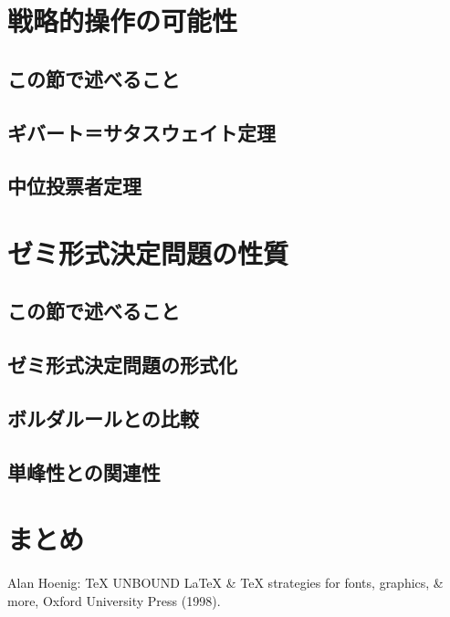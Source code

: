 \documentclass{jsarticle}
\begin{document}
\section{戦略的操作の可能性}
\subsection{この節で述べること}
\subsection{ギバート＝サタスウェイト定理}
\subsection{中位投票者定理}

\section{ゼミ形式決定問題の性質}
\subsection{この節で述べること}
\subsection{ゼミ形式決定問題の形式化}
\subsection{ボルダルールとの比較}
\subsection{単峰性との関連性}

\section{まとめ}

\begin{thebibliography}{9}
  Alan Hoenig: \TeX{} UNBOUND \LaTeX{} \& \TeX{} strategies
  for fonts, graphics, \& more, Oxford University Press (1998).
\end{thebibliography}
\end{document}
